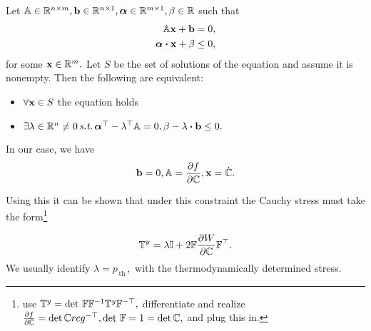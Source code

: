 \documentclass[11pt]{scrartcl} %
\begin{document}
\begin{theorem}
Let $\mathbb{A} \in {\mathbb R}^{n \times m}, \vb{b} \in {\mathbb R}^{n \times 1}, \vb*{\alpha}\in {\mathbb R}^{m \times 1}, \beta \in {\mathbb R}$ such that
\begin{align*}
	\tensorq{A}\vb{x}+\vb{b} &= 0, \\
	\vb*{\alpha}\vdot \vb{x} + \beta &\leq 0,
\end{align*}
for some $\vb{x} \in {\mathbb R}^{m}.$
    Let $S$ be the set of solutions of the equation and assume it is nonempty. Then the following are equivalent:
\begin{itemize}
	\item $\forall \vb{x} \in S$ the equation holds
	\item $\exists \lambda \in \R^n \neq 0 \, \text{\textit{s.t.}} \, \transpose{\vb*{\alpha}}- \transpose{\lambda}\tensorq{A} =0, \beta - \lambda \vdot \vb{b} \leq 0.$
\end{itemize}
\end{theorem}

\begin{remark}
	In our case, we have
	\[
		\vb{b} =0, \mathbb{A} = \pdv{f}{\ensuremath{\mathbb{C}}}, \vb{x} = \dot{\mathbb{C}}.
	\]
\end{remark}

Using this it can be shown that under this constraint the Cauchy stress must take the form\footnote{use $\mathbb{T}^y = \det\, \mathbb{F} \mathbb{F}^{-1} \mathbb{T}^y \mathbb{F}^{-\top},$ differentiate and realize $\pdv{f}{\ensuremath{\mathbb{C}}} = \det \mathbb{C} rcg^{-\top}, \det\, \mathbb{F} = 1 = \det \mathbb{C},$ and plug this in.}

\[
	\mathbb{T}^y = \lambda \mathbb{I} + 2 \mathbb{F} \pdv{W}{\ensuremath{\mathbb{C}}} \mathbb{F}^\top.
\]
We usually identify $\lambda = p_{\, \text{th} \,},$ with the thermodynamically determined stress.
\end{document}

